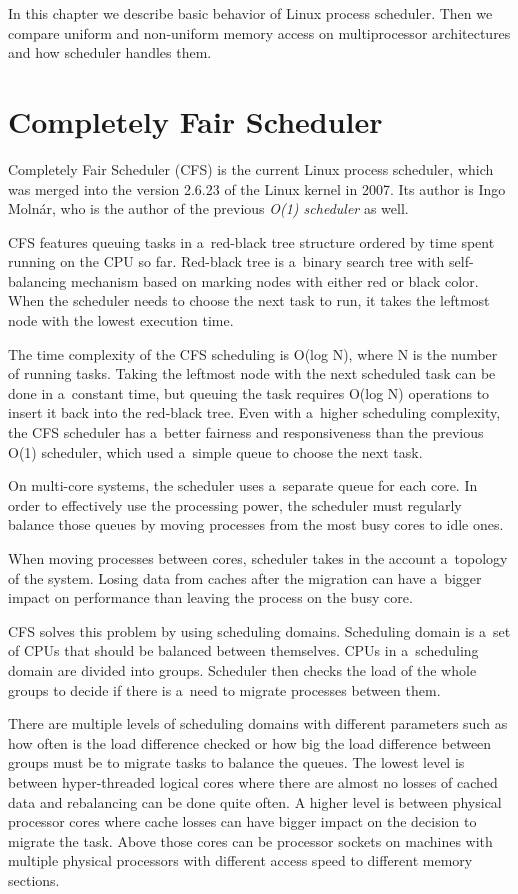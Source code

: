 In this chapter we describe basic behavior of Linux process scheduler. Then we
compare uniform and non-uniform memory access on multiprocessor architectures
and how scheduler handles them.

\section{Completely Fair Scheduler}
Completely Fair Scheduler (CFS) is the current Linux process scheduler, which was
merged into the version 2.6.23 of the Linux kernel in 2007. Its author is Ingo
Molnár, who is the author of the previous \emph{O(1) scheduler} as well.

CFS features queuing tasks in a~red-black tree structure ordered by time spent
running on the CPU so far. Red-black tree is a~binary search
tree with self-balancing mechanism based on marking nodes with either red or
black color. When the scheduler needs to choose the next task to run, it takes
the leftmost node with the lowest execution time.

The time complexity of the CFS scheduling is O(log N), where N is the number
of running tasks. Taking the leftmost node
with the next scheduled task can be done in a~constant time, but queuing the task
requires O(log N) operations to insert it back into the red-black tree. Even
with a~higher scheduling complexity, the CFS scheduler has a~better fairness and
responsiveness than the previous O(1) scheduler, which used a~simple queue to
choose the next task.

On multi-core systems, the scheduler uses a~separate queue for each core. In
order to effectively use the processing power, the scheduler must regularly
balance those queues by moving processes from the most busy cores to idle ones.

When moving processes between cores, scheduler takes in the account a~topology
of the system. Losing data from caches after the migration can have a~bigger
impact on performance than leaving the process on the busy core.

CFS solves this problem by using scheduling
domains\;\cite{understanding-linux-kernel}. Scheduling domain is a~set
of CPUs that should be balanced between themselves. CPUs in a~scheduling domain
are divided into groups. Scheduler then checks the load of the whole groups to
decide if there is a~need to migrate processes between them.

There are multiple levels of scheduling domains with different parameters such as
how often is the load difference checked or how big the load difference between
groups must be to migrate tasks to balance the queues.
The lowest level is between hyper-threaded logical cores where there are almost
no losses of cached data and rebalancing can be done quite often.
A higher level is between physical processor cores where cache losses can have
bigger impact on the decision to migrate the task.
Above those cores can be processor sockets on machines with multiple physical
processors with different access speed to different memory sections.

